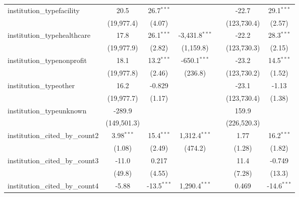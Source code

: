 \begin{tabular}{lcccccc}
   institution\_typefacility             & 20.5          & 26.7$^{***}$  &                  &               & -22.7         & 29.1$^{***}$\\   
                                         & (19,977.4)    & (4.07)        &                  &               & (123,730.4)   & (2.57)\\   
   institution\_typehealthcare           & 17.8          & 26.1$^{***}$  & -3,431.8$^{***}$ &               & -22.2         & 28.3$^{***}$\\   
                                         & (19,977.9)    & (2.82)        & (1,159.8)        &               & (123,730.3)   & (2.15)\\   
   institution\_typenonprofit            & 18.1          & 13.2$^{***}$  & -650.1$^{***}$   &               & -23.2         & 14.5$^{***}$\\   
                                         & (19,977.8)    & (2.46)        & (236.8)          &               & (123,730.2)   & (1.52)\\   
   institution\_typeother                & 16.2          & -0.829        &                  &               & -23.1         & -1.13\\   
                                         & (19,977.7)    & (1.17)        &                  &               & (123,730.4)   & (1.38)\\   
   institution\_typeunknown              & -289.9        &               &                  &               & 159.9         &   \\   
                                         & (149,501.3)   &               &                  &               & (226,520.3)   &   \\   
   institution\_cited\_by\_count2        & 3.98$^{***}$  & 15.4$^{***}$  & 1,312.4$^{***}$  &               & 1.77          & 16.2$^{***}$\\   
                                         & (1.08)        & (2.49)        & (474.2)          &               & (1.28)        & (1.82)\\   
   institution\_cited\_by\_count3        & -11.0         & 0.217         &                  &               & 11.4          & -0.749\\   
                                         & (49.8)        & (4.55)        &                  &               & (7.28)        & (13.3)\\   
   institution\_cited\_by\_count4        & -5.88         & -13.5$^{***}$ & 1,290.4$^{***}$  &               & 0.469         & -14.6$^{***}$\\   

\end{tabular}
